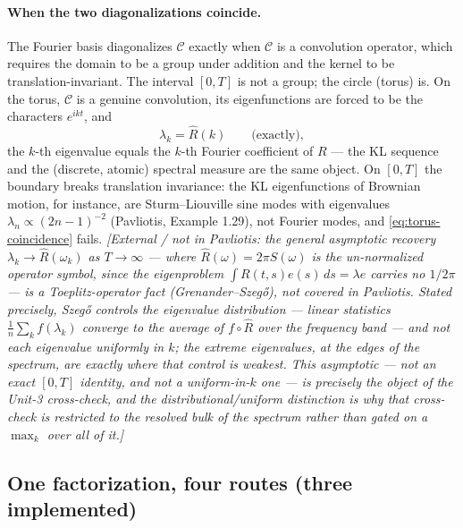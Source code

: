 \documentclass[11pt]{article}
\newcommand{\extnote}[1]{{\small\color{extgray}\emph{[External / not in Pavliotis: #1]}}}
\newcommand{\pav}[1]{{\small\color{hubblue}(Pavliotis, #1)}}
\begin{document}
\paragraph{When the two diagonalizations coincide.}
The Fourier basis diagonalizes $\mathcal{C}$ exactly when $\mathcal{C}$ is a convolution operator,
which requires the domain to be a group under addition and the kernel to be translation-invariant.
The interval $[0,T]$ is not a group; the circle (torus) is. On the torus, $\mathcal{C}$ is a genuine
convolution, its eigenfunctions are forced to be the characters $e^{ikt}$, and
\begin{equation}
\lambda_k = \hat R(k) \qquad \text{(exactly)},
\label{eq:torus-coincidence}
\end{equation}
the $k$-th eigenvalue equals the $k$-th Fourier coefficient of $R$ --- the KL sequence and the
(discrete, atomic) spectral measure are the same object. On $[0,T]$ the boundary breaks translation
invariance: the KL eigenfunctions of Brownian motion, for instance, are Sturm--Liouville sine modes
with eigenvalues $\lambda_n \propto (2n-1)^{-2}$ \pav{Example 1.29}, not Fourier modes, and
\eqref{eq:torus-coincidence} fails. \extnote{the general asymptotic recovery $\lambda_k \to \hat
R(\omega_k)$ as $T\to\infty$ --- where $\hat R(\omega)=2\pi S(\omega)$ is the \emph{un-normalized}
operator symbol, since the eigenproblem $\int R(t,s)e(s)\,ds=\lambda e$ carries no $1/2\pi$ --- is a
Toeplitz-operator fact (Grenander--Szeg\H{o}), not covered in Pavliotis. Stated precisely, Szeg\H{o}
controls the eigenvalue \emph{distribution} --- linear statistics $\frac1n\sum_k f(\lambda_k)$
converge to the average of $f\circ \hat R$ over the frequency band --- and \emph{not} each eigenvalue
uniformly in $k$; the extreme eigenvalues, at the edges of the spectrum, are exactly where that
control is weakest. This asymptotic --- not an exact $[0,T]$ identity, and not a uniform-in-$k$ one
--- is precisely the object of the Unit-3 cross-check, and the distributional/uniform distinction is
why that cross-check is restricted to the resolved bulk of the spectrum rather than gated on a
$\max_k$ over all of it.}

\subsection{One factorization, four routes (three implemented)}
\end{document}
